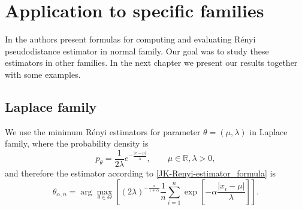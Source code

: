 {\section{Application to specific families}

In \cite{Vajda2009} the authors present formulas for computing and evaluating R\'{e}nyi pseudodistance estimator in normal family. Our goal was to study these estimators in other families. In the next chapter we present our results together with some examples.


\subsection*{Laplace family}
We use the minimum R\'{e}nyi estimators for parameter $\theta = (\mu,\lambda)$ in Laplace family, where the probability density is
\begin{equation}
	p_\theta = \frac{1}{2\lambda} e^{-\frac{|x-\mu|}{\lambda}}, \qquad \mu\in \mathbb{R}, \lambda>0,
\end{equation}
and therefore the estimator according to \eqref{JK-Renyi-estimator_formula} is
\begin{equation}
	\theta_{\alpha,n} = \arg \max_{\theta \in \Theta} \left[ (2\lambda)^{-\frac{\alpha}{1+\alpha}} \frac{1}{n} \sum_{i=1}^n \exp \left[-\alpha\frac{|x_i-\mu|}{\lambda} \right] \right].
\end{equation}

}
